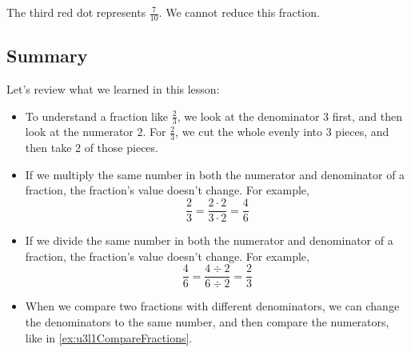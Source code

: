 The third red dot represents $\frac{7}{10}$. We cannot reduce this fraction.

\subsection{Summary}
Let's review what we learned in this lesson:
\begin{itemize}
\item To understand a fraction like $\frac{2}{3}$, we look at the denominator $3$ first, and then look at the numerator $2$. For $\frac{2}{3}$, we cut the whole evenly into $3$ pieces, and then take $2$ of those pieces.
\item If we multiply the same number in both the numerator and denominator of a fraction, the fraction's value doesn't change. For example, 
\[ \frac{2}{3}=\frac{2\cdot2}{3\cdot2}=\frac{4}{6} \]
\item If we divide the same number in both the numerator and denominator of a fraction, the fraction's value doesn't change. For example, 
\[ \frac{4}{6}=\frac{4\div2}{6\div2}=\frac{2}{3} \]
\item When we compare two fractions with different denominators, we can change the denominators to the same number, and then compare the numerators, like in \cref{ex:u3l1CompareFractions}.
\end{itemize}